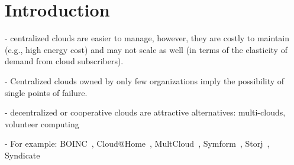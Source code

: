 \section{Introduction} \label{sect:intro}

- centralized clouds are easier to manage, however, they are costly to maintain (e.g., high energy cost) and may not scale as well (in terms of the elasticity of demand from cloud subscribers).

- Centralized clouds owned by only few organizations imply the possibility of single points of failure.

- decentralized or cooperative clouds are attractive alternatives: multi-clouds, volunteer computing

- For example: BOINC~\cite{BOINC}, Cloud@Home~\cite{DP12}, MultCloud~\cite{MultCloud}, Symform~\cite{Symform}, Storj~\cite{Storj}, Syndicate~\cite{Syndicate}
